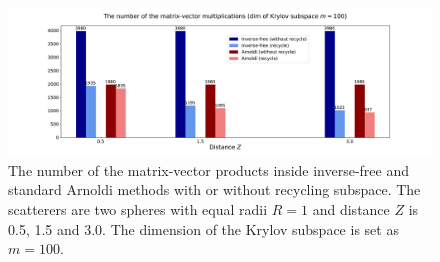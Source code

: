 \begin{figure}[H]
    \centering
    \hspace*{-1.5cm}\includegraphics[scale = 0.4]{figures/matvec_100.pdf}
    \caption{The number of the matrix-vector products inside inverse-free and standard Arnoldi methods with or without recycling subspace. The scatterers are two spheres with equal radii $R = 1$ and distance $Z$ is 0.5, 1.5 and 3.0. The dimension of the Krylov subspace is set as $m = 100$.}
    \label{matvec100}
\end{figure}

